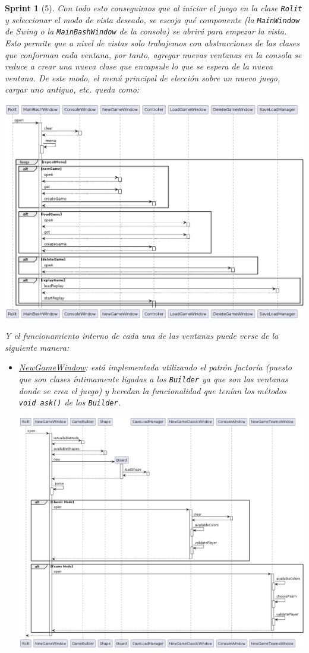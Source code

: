 \documentclass[12pt,a4paper,openright]{book}
\theoremstyle{break}
\newtheorem*{sprint}{Sprint}
\begin{document}
\begin{sprint}[5]
Con todo esto conseguimos que al iniciar el juego en la clase \texttt{Rolit} y seleccionar el modo de vista deseado, se escoja qué componente (la \texttt{MainWindow} de \textit{Swing} o la \texttt{MainBashWindow} de la consola) se abrirá para empezar la vista. Esto permite que a nivel de vistas solo trabajemos con abstracciones de las clases que conforman cada ventana, por tanto, agregar nuevas ventanas en la consola se reduce a crear una nueva clase que encapsule lo que se espera de la nueva ventana. De este modo, el menú principal de elección sobre un nuevo juego, cargar uno antiguo, etc. queda como:
\begin{center}
\includegraphics[scale=0.40]{MenuPpal_sprint5_seq}
\end{center}
Y el funcionamiento interno de cada una de las ventanas puede verse de la siguiente manera:
\begin{itemize}
\item \underline{NewGameWindow}: está implementada utilizando el patrón factoría (puesto que son clases íntimamente ligadas a los \texttt{Builder} ya que son las ventanas donde se crea el juego) y heredan la funcionalidad que tenían los métodos \texttt{void ask()} de los \texttt{Builder}.
\begin{center}
\includegraphics[scale=0.40, angle=90]{NewGameWindow_sprint5_seq}

\end{center}
\end{itemize}
\end{sprint}
\end{document}
